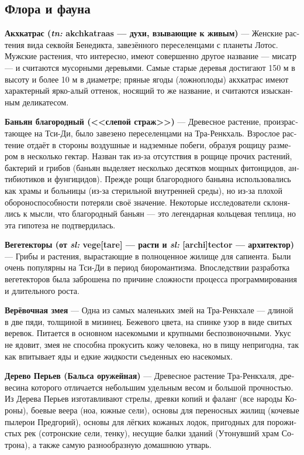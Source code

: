 \documentclass[a4paper,12pt,fleqn]{book}\usepackage{cooltooltips}\usepackage{polyglossia}\setdefaultlanguage[babelshorthands=true]{russian}\setotherlanguage{english}\defaultfontfeatures{Ligatures=TeX,Mapping=tex-text} \usepackage{xcolor}\definecolor{lightgray}{HTML}{bbbbbb}\color{lightgray}\newcommand{\ml}[3]{\textenglish{\textcolor{black}{#3}}}
\newcommand{\theterm}[3]{\textbf{\hypertarget{#1}{#2}} --- #3}
\newcommand{\theorigin}[3]{\textit{#1:} #2 --- #3}
\begin{document}
\subsection{Флора и фауна}

\theterm{akchkatraas}
{Акхкатрас (\theorigin{tn}{akchkatraas}{духи, взывающие к живым})}
{Женские растения вида секвойя Бенедикта, завезённого переселенцами с планеты Лотос.
Мужские растения, что интересно, имеют совершенно другое название --- мисатр --- и считаются мусорными деревьями.
Самые старые деревья достигают 150 м в высоту и более 10 м в диаметре;
пряные ягоды (ложноплоды) акхкатрас имеют характерный ярко-алый оттенок, носящий то же название, и считаются изысканным деликатесом.}

\theterm{noble-banyan} %
{Баньян благородный (<<слепой страж>>)}
{Древесное растение, произрастающее на Тси-Ди, было завезено переселенцами на Тра-Ренкхаль.
Взрослое растение отдаёт в стороны воздушные и надземные побеги, образуя рощицу размером в несколько гектар.
Назван так из-за отсутствия в рощице прочих растений, бактерий и грибов (баньян выделяет несколько десятков мощных фитонцидов, антибиотиков и фунгицидов).
Прежде рощи благородного баньяна использовались как храмы и больницы (из-за стерильной внутренней среды), но из-за плохой обороноспособности потеряли своё значение.
Некоторые исследователи склонялись к мысли, что благородный баньян --- это легендарная кольцевая теплица, но эта гипотеза не подтвердилась.}

\theterm{vegetectors}
{Вегетекторы (от \theorigin{sl}{vege[tare]}{расти} и \theorigin{sl}{[archi]tector}{архитектор})}
{Грибы и растения, вырастающие в полноценное жилище для сапиента.
Были очень популярны на Тси-Ди в период биоромантизма.
Впоследствии разработка вегетекторов была заброшена по причине сложности процесса программирования и длительного роста.}

\theterm{rope-snake} %
{Верёвочная змея}
{Одна из самых маленьких змей на Тра-Ренкхале --- длиной в две пяди, толщиной в мизинец.
Бежевого цвета, на спинке узор в виде свитых веревок.
Питается в основном насекомыми и крупными беспозвоночными.
Укус не ядовит, змея не способна прокусить кожу человека, но в пищу непригодна, так как впитывает яды и едкие жидкости съеденных ею насекомых.}

\theterm{featherwood}
{Дерево Перьев (Бальса оружейная)}
{Древесное растение Тра-Ренкхаля, древесина которого отличается небольшим удельным весом и большой прочностью.
Из Дерева Перьев изготавливают стрелы, древки копий и фаланг (все народы Короны), боевые веера (ноа, южные сели), основы для переносных жилищ (кочевые пылерои Предгорий), основы для лёгких кожаных лодок, пригодных для порожистых рек (сотронские сели, тенку), несущие балки зданий (Утонувший храм Сотрона), а также самую разнообразную домашнюю утварь.}
\end{document}
